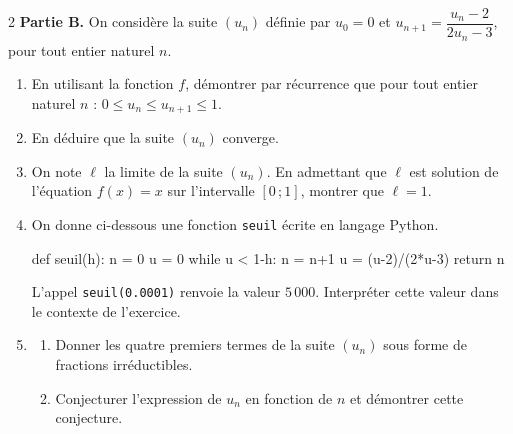 \documentclass[a4paper,10pt]{article}
\makeatletter
\newcommand{\lycee@intff}[2]{\left[#1\,;#2\right]}
\providecommand{\intff}{\lycee@intff}%
\makeatother
\begin{document}
\begin{multicols}{2}
\textbf{Partie B.} On considère la suite $(u_{n})$ définie par $u_{0}=0$ et
$u_{n+1}=\dfrac{u_{n}-2}{2u_{n}-3}$, pour tout entier naturel $n$.
\begin{enumerate}
  \item En utilisant la fonction $f$, démontrer par récurrence que pour tout entier
        naturel $n$ : $0\leq u_{n}\leq u_{n+1}\leq 1$.
  \item En déduire que la suite $(u_{n})$ converge.
  \item On note $\ell$ la limite de la suite $(u_{n})$. En admettant que $\ell$ est
        solution de l'équation $f(x)=x$ sur l'intervalle $\intff{0}{1}$, montrer que
        $\ell=1$.
  \item On donne ci-dessous une fonction \texttt{seuil} écrite en langage Python.
\begin{python}
def seuil(h):
    n = 0
    u = 0
    while u < 1-h:
        n = n+1
        u = (u-2)/(2*u-3)
    return n
\end{python}
        L'appel \texttt{seuil(0.0001)} renvoie la valeur $5\,000$. Interpréter cette
        valeur dans le contexte de l'exercice.
  \item
  \begin{enumerate}[label=\alph*)]
    \item Donner les quatre premiers termes de la suite $(u_{n})$ sous forme de
          fractions irréductibles.
    \item Conjecturer l'expression de $u_{n}$ en fonction de $n$ et démontrer cette
          conjecture.
  \end{enumerate}
\end{enumerate}

\end{multicols}
\end{document}
